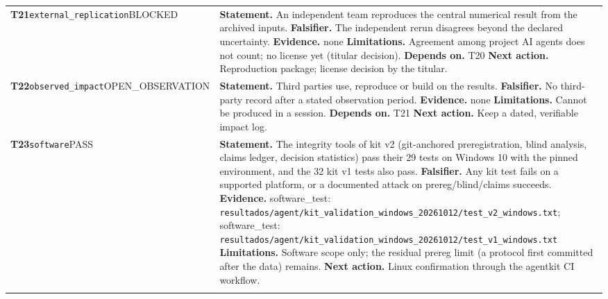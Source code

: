 \begin{longtable}{@{}>{\raggedright\arraybackslash}p{2.35cm}>{\raggedright\arraybackslash}p{13.2cm}@{}}
\textbf{T21}\newline \texttt{external\_\allowbreak{}replication}\newline BLOCKED & \textbf{Statement.} An independent team reproduces the central numerical result from the archived inputs. \newline \textbf{Falsifier.} The independent rerun disagrees beyond the declared uncertainty. \newline \textbf{Evidence.} none \newline \textbf{Limitations.} Agreement among project AI agents does not count; no license yet (titular decision). \newline \textbf{Depends on.} T20 \newline \textbf{Next action.} Reproduction package; license decision by the titular. \\ \addlinespace[2pt]
\textbf{T22}\newline \texttt{observed\_\allowbreak{}impact}\newline OPEN\_\allowbreak{}OBSERVATION & \textbf{Statement.} Third parties use, reproduce or build on the results. \newline \textbf{Falsifier.} No third-party record after a stated observation period. \newline \textbf{Evidence.} none \newline \textbf{Limitations.} Cannot be produced in a session. \newline \textbf{Depends on.} T21 \newline \textbf{Next action.} Keep a dated, verifiable impact log. \\ \addlinespace[2pt]
\textbf{T23}\newline \texttt{software}\newline PASS & \textbf{Statement.} The integrity tools of kit v2 (git-anchored preregistration, blind analysis, claims ledger, decision statistics) pass their 29 tests on Windows 10 with the pinned environment, and the 32 kit v1 tests also pass. \newline \textbf{Falsifier.} Any kit test fails on a supported platform, or a documented attack on prereg/\allowbreak{}blind/\allowbreak{}claims succeeds. \newline \textbf{Evidence.} software\_\allowbreak{}test: \texttt{resultados/\allowbreak{}agent/\allowbreak{}kit\_\allowbreak{}validation\_\allowbreak{}windows\_\allowbreak{}20261012/\allowbreak{}test\_\allowbreak{}v2\_\allowbreak{}windows.txt}; software\_\allowbreak{}test: \texttt{resultados/\allowbreak{}agent/\allowbreak{}kit\_\allowbreak{}validation\_\allowbreak{}windows\_\allowbreak{}20261012/\allowbreak{}test\_\allowbreak{}v1\_\allowbreak{}windows.txt} \newline \textbf{Limitations.} Software scope only; the residual prereg limit (a protocol first committed after the data) remains. \newline \textbf{Next action.} Linux confirmation through the agentkit CI workflow. \\ \addlinespace[2pt]

\end{longtable}
